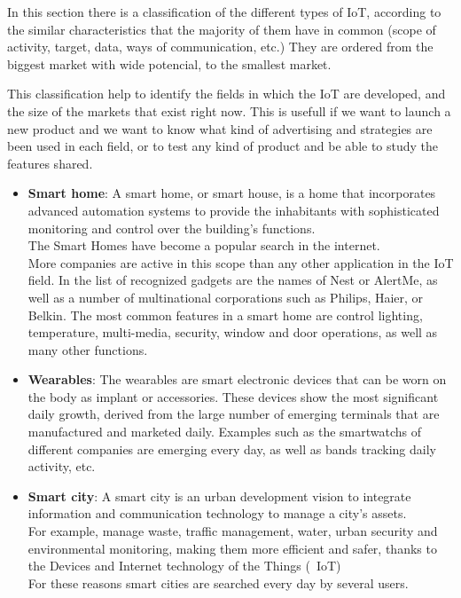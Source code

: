 
In this section there is a classification of the different types of IoT, according to the similar characteristics that the majority of them have in common (scope of activity, target, data, ways of communication, etc.) They are ordered from the biggest market with wide potencial, to the smallest market. 

This classification help to identify the fields in which the IoT are developed, and the size of the markets that exist right now. This is usefull if we want to launch a new product and we want to know what kind of advertising and strategies are been used in each field, or to test any kind of product and be able to study the features shared.

\begin{itemize}
	\item \textbf{Smart home}: A smart home, or smart house, is a home that incorporates advanced automation systems to provide the inhabitants with sophisticated monitoring and control over the building's functions.\\ The Smart Homes have become a popular search in the internet.\\ More companies are active in this scope than any other application in the IoT field. In the list of recognized gadgets are the names of Nest or AlertMe, as well as a number of multinational corporations such as Philips, Haier, or Belkin. The most common features in a smart home are control lighting, temperature, multi-media, security, window and door operations, as well as many other functions.

	\item \textbf{Wearables}: The wearables are smart electronic devices that can be worn on the body as implant or accessories. These devices show the most significant daily growth, derived from the large number of emerging terminals that are manufactured and marketed daily. Examples such as the smartwatchs of different companies are emerging every day, as well as bands tracking daily activity, etc.

	\item \textbf{Smart city}: A smart city is an urban development vision to integrate information and communication technology to manage a city's assets.\\ For example, manage waste, traffic management, water, urban security and environmental monitoring, making them more efficient and safer, thanks to the Devices and Internet technology of the Things (\ IoT)\\ For these reasons smart cities are searched every day by several users.


\end{itemize}
